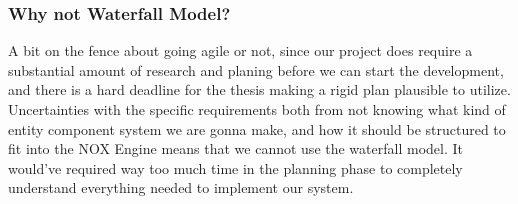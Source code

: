 \subsubsection{Why not Waterfall Model?}
A bit on the fence about going agile or not, since our project does require a substantial amount of research and planing before we can start the development, 
and there is a hard deadline for the thesis making a rigid plan plausible to utilize. 
Uncertainties with the specific requirements both from not knowing what kind of entity component system we are gonna make, 
and how it should be structured to fit into the NOX Engine means that we cannot use the waterfall model.
It would've required way too much time in the planning phase to completely understand everything needed to implement our system.